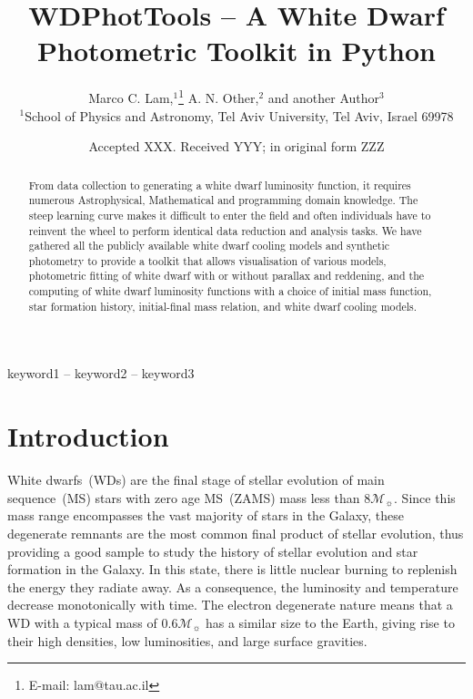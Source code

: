 \documentclass[fleqn,usenatbib]{rasti}
\title[WD Photometric Toolkit]{WDPhotTools -- A White Dwarf Photometric Toolkit in Python}
\author[M. C. Lam et al.]{
Marco C. Lam,$^{1}$\thanks{E-mail: lam@tau.ac.il}
A. N. Other,$^{2}$
and another Author$^{3}$
\\
$^{1}$School of Physics and Astronomy, Tel Aviv University, Tel Aviv, Israel 69978
}
\date{Accepted XXX. Received YYY; in original form ZZZ}
\newcommand{\msun}{\mathcal{M}_{\sun}}
\begin{document}
\label{firstpage}
\pagerange{\pageref{firstpage}--\pageref{lastpage}}
\maketitle

\begin{abstract}
From data collection to generating a white dwarf luminosity function, it
requires numerous Astrophysical, Mathematical and programming domain
knowledge. The steep learning curve makes it difficult to enter the field and
often individuals have to reinvent the wheel to perform identical data reduction
and analysis tasks. We have gathered all the publicly available white dwarf
cooling models and synthetic photometry to provide a toolkit that allows
visualisation of various models, photometric fitting of white dwarf with or
without parallax and reddening, and the computing of white dwarf luminosity
functions with a choice of initial mass function, star formation history,
initial-final mass relation, and white dwarf cooling models.

\end{abstract}

\begin{keywords}
keyword1 -- keyword2 -- keyword3
\end{keywords}


\section{Introduction}
White dwarfs~(WDs) are the final stage of stellar evolution of main
sequence~(MS) stars with zero age MS~(ZAMS) mass less than $8\msun$. Since this
mass range encompasses the vast majority of stars in the Galaxy, these
degenerate remnants are the most common final product of stellar evolution,
thus providing a good sample to study the history of stellar evolution and star
formation in the Galaxy. In this state, there is little nuclear burning to
replenish the energy they radiate away. As a consequence, the luminosity and
temperature decrease monotonically with time. The electron degenerate nature
means that a WD with a typical mass of $0.6\mathcal{M}_{\sun}$ has a similar
size to the Earth, giving rise to their high densities, low luminosities, and
large surface gravities.
\end{document}
